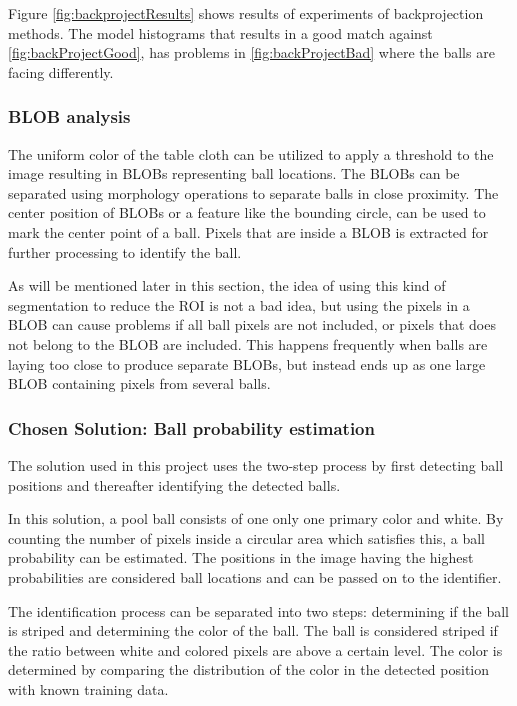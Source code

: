 Figure \ref{fig:backprojectResults} shows results of experiments of backprojection methods. The model histograms that results in a good match against \ref{fig:backProjectGood}, has problems in \ref{fig:backProjectBad} where the balls are facing differently.

\subsubsection{BLOB analysis}
The uniform color of the table cloth can be utilized to apply a threshold to the image resulting in BLOBs representing ball locations. The BLOBs can be separated using morphology operations to separate balls in close proximity. The center position of BLOBs or a feature like the bounding circle, can be used to mark the center point of a ball. Pixels that are inside a BLOB is extracted for further processing to identify the ball.

As will be mentioned later in this section, the idea of using this kind of segmentation to reduce the ROI is not a bad idea, but using the pixels in a BLOB can cause problems if all ball pixels are not included, or pixels that does not belong to the BLOB are included. This happens frequently when balls are laying too close to produce separate BLOBs, but instead ends up as one large BLOB containing pixels from several balls.

\subsubsection{Chosen Solution: Ball probability estimation}
The solution used in this project uses the two-step process by first detecting ball positions and thereafter identifying the detected balls.

In this solution, a pool ball consists of one only one primary color and white. By counting the number of pixels inside a circular area which satisfies this, a ball probability can be estimated. The positions in the image having the highest probabilities are considered ball locations and can be passed on to the identifier.

The identification process can be separated into two steps: determining if the ball is striped and determining the color of the ball. The ball is considered striped if the ratio between white and colored pixels are above a certain level. The color is determined by comparing the distribution of the color in the detected position with known training data.